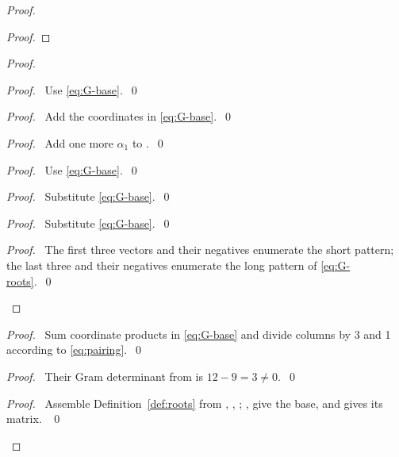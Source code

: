 \begin{proof}
\begin{proof}
\end{proof}
\begin{proof}
\begin{proof}\pf\ Use \eqref{eq:G-base}.~\qed\end{proof}
\begin{proof}\pf\ Add the coordinates in \eqref{eq:G-base}.~\qed\end{proof}
\begin{proof}\pf\ Add one more $\alpha_1$ to .~\qed\end{proof}
\begin{proof}\pf\ Use \eqref{eq:G-base}.~\qed\end{proof}
\begin{proof}\pf\ Substitute \eqref{eq:G-base}.~\qed\end{proof}
\begin{proof}\pf\ Substitute \eqref{eq:G-base}.~\qed\end{proof}
\qedstep
\begin{proof}\pf\ The first three vectors and their negatives enumerate
the short pattern; the last three and their negatives enumerate the
long pattern of \eqref{eq:G-roots}.~\qed\end{proof}
\end{proof}
\begin{proof}\pf\ Sum coordinate products in \eqref{eq:G-base} and
divide columns by 3 and 1 according to \eqref{eq:pairing}.~\qed\end{proof}
\begin{proof}\pf\ Their Gram determinant from  is
$12-9=3\ne0$.~\qed\end{proof}
\qedstep
\begin{proof}\pf\ Assemble Definition~\ref{def:roots} from
, , ;
,  give the base, and
 gives its matrix. ~\qed\end{proof}
\end{proof}

